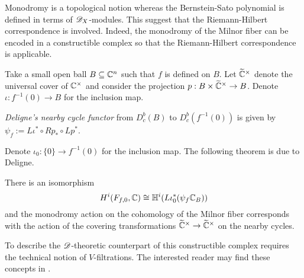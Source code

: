 Monodromy is a topological notion whereas the Bernstein-Sato polynomial is defined in terms of $\mathscr{D}_X$-modules.
This suggest that the Riemann-Hilbert correspondence is involved.
Indeed, the monodromy of the Milnor fiber can be encoded in a constructible complex so that the Riemann-Hilbert correspondence is applicable.

Take a small open ball $B\subseteq \mathbb{C}^n$ such that $f$ is defined on $B$.
Let $\widetilde{\mathbb{C}}^\times$ denote the universal cover of $\mathbb{C}^\times$ and consider the projection $p:B\times \widetilde{\mathbb{C}}^\times \to B$.
Denote $\iota:f^{-1}(0)\to B$ for the inclusion map.
\begin{definition}
  {\it Deligne's nearby cycle functor} from $D^b_c(B)$ to $D_c^b(f^{-1}(0))$ is given by $\psi_f:= L\iota^* \circ Rp_*\circ Lp^*$.
\end{definition}
Denote $\iota_0:\{0\}\to f^{-1}(0)$ for the inclusion map.
The following theorem is due to Deligne.
\begin{theorem}
  There is an isomorphism
  $$H^i(F_{f,0}, \mathbb{C}) \cong \mathbb{H}^i(L\iota_0^* (\psi_f \mathbb{C}_B)) $$
  and the monodromy action on the cohomology of the Milnor fiber corresponds with the action of the covering transformations $\widetilde{\mathbb{C}}^\times \to \widetilde{\mathbb{C}}^\times$ on the nearby cycles.
\end{theorem}
To describe the $\mathscr{D}$-theoretic counterpart of this constructible complex requires the technical notion of $V$-filtrations.
The interested reader may find these concepts in \cite{budur2015bernstein}.
